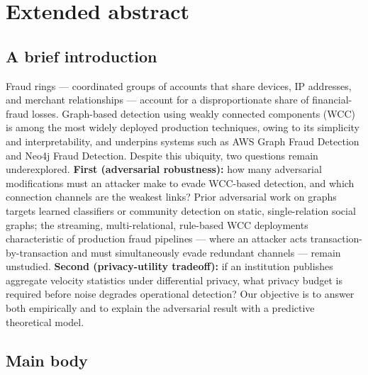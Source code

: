 \documentclass[12pt,a4paper]{article}
\begin{document}
\section*{Extended abstract}

\subsection*{A brief introduction}

Fraud rings --- coordinated groups of accounts that share devices, IP
addresses, and merchant relationships --- account for a disproportionate share
of financial-fraud losses. Graph-based detection using weakly connected
components (WCC) is among the most widely deployed production techniques, owing
to its simplicity and interpretability, and underpins systems such as AWS Graph
Fraud Detection and Neo4j Fraud Detection. Despite this ubiquity, two questions
remain underexplored. \textbf{First (adversarial robustness):} how many
adversarial modifications must an attacker make to evade WCC-based detection,
and which connection channels are the weakest links? Prior adversarial work on
graphs targets learned classifiers or community detection on static,
single-relation social graphs; the streaming, multi-relational, rule-based WCC
deployments characteristic of production fraud pipelines --- where an attacker
acts transaction-by-transaction and must simultaneously evade redundant
channels --- remain unstudied. \textbf{Second (privacy-utility tradeoff):} if
an institution publishes aggregate velocity statistics under differential
privacy, what privacy budget is required before noise degrades operational
detection? Our objective is to answer both empirically and to explain the
adversarial result with a predictive theoretical model.

\subsection*{Main body}
\end{document}
